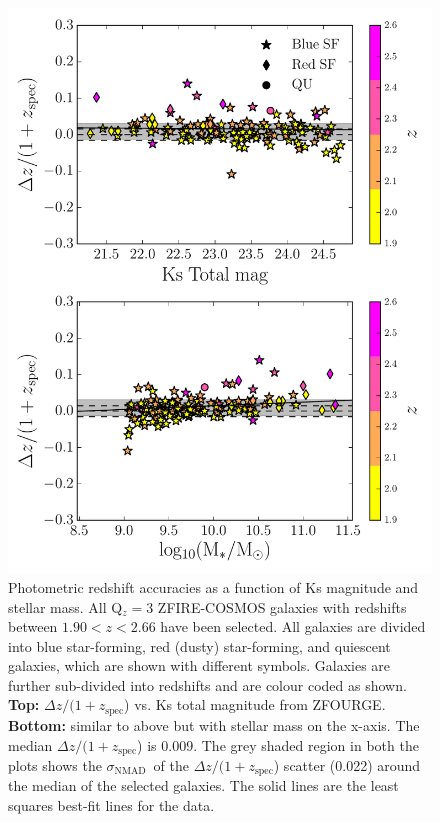\documentclass[iop]{emulateapj}
\newcommand{\NMAD}{$\sigma_{\mathrm{NMAD}}$}
\begin{document}
\begin{figure}
\includegraphics[trim = 10 10 10 10, clip, scale=0.58]{figures/delta_z_vs_mass_mag.pdf}
\caption{ Photometric redshift accuracies as a function of Ks magnitude and stellar mass. 
All Q$_z=3$ ZFIRE-COSMOS galaxies with redshifts between $1.90<z<2.66$ have been selected. 
All galaxies are divided into blue star-forming, red (dusty) star-forming, and quiescent galaxies, which are shown with different symbols. Galaxies are further sub-divided into redshifts and are colour coded as shown. 
{\bf Top:} $\Delta z/(1+z_\mathrm{spec}$) vs. Ks total magnitude from ZFOURGE.  
{\bf Bottom:} similar to above but with stellar mass on the x-axis. 
The median  $\Delta z/(1+z_\mathrm{spec}$) is 0.009.
The grey shaded region in both the plots shows the \NMAD\ of the $\Delta z/(1+z_\mathrm{spec}$) scatter (0.022) around the median of the selected galaxies. The solid lines are the least squares best-fit lines for the data. 
}
\label{fig:delta_z_vs_param}
\end{figure}
\end{document}
